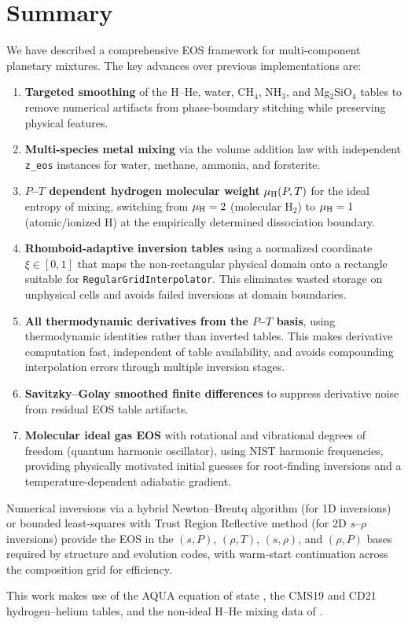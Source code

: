 \documentclass[twocolumn]{aastex701}
\begin{document}
\section{Summary}\label{sec:summary}

We have described a comprehensive EOS framework for multi-component planetary mixtures.
The key advances over previous implementations are:
\begin{enumerate}
    \item \textbf{Targeted smoothing} of the H--He, water, CH$_4$, NH$_3$, and Mg$_2$SiO$_4$ tables to remove numerical artifacts from phase-boundary stitching while preserving physical features.
    \item \textbf{Multi-species metal mixing} via the volume addition law with independent \texttt{z\_eos} instances for water, methane, ammonia, and forsterite.
    \item \textbf{$P$--$T$ dependent hydrogen molecular weight} $\mu_{\rm H}(P,T)$ for the ideal entropy of mixing, switching from $\mu_{\rm H} = 2$ (molecular H$_2$) to $\mu_{\rm H} = 1$ (atomic/ionized H) at the empirically determined dissociation boundary.
    \item \textbf{Rhomboid-adaptive inversion tables} using a normalized coordinate $\xi \in [0,1]$ that maps the non-rectangular physical domain onto a rectangle suitable for \texttt{RegularGridInterpolator}.  This eliminates wasted storage on unphysical cells and avoids failed inversions at domain boundaries.
    \item \textbf{All thermodynamic derivatives from the $P$--$T$ basis}, using thermodynamic identities rather than inverted tables.  This makes derivative computation fast, independent of table availability, and avoids compounding interpolation errors through multiple inversion stages.
    \item \textbf{Savitzky--Golay smoothed finite differences} to suppress derivative noise from residual EOS table artifacts.
    \item \textbf{Molecular ideal gas EOS} with rotational and vibrational degrees of freedom (quantum harmonic oscillator), using NIST harmonic frequencies, providing physically motivated initial guesses for root-finding inversions and a temperature-dependent adiabatic gradient.
\end{enumerate}
Numerical inversions via a hybrid Newton--Brentq algorithm (for 1D inversions) or bounded least-squares with Trust Region Reflective method (for 2D $s$--$\rho$ inversions) provide the EOS in the $(s,P)$, $(\rho,T)$, $(s,\rho)$, and $(\rho,P)$ bases required by structure and evolution codes, with warm-start continuation across the composition grid for efficiency.

\begin{acknowledgments}
This work makes use of the AQUA equation of state \citep{Haldemann2020}, the CMS19 \citep{Chabrier2019} and CD21 \citep{Chabrier2021} hydrogen--helium tables, and the non-ideal H--He mixing data of \citet{Howard2023a}.
\end{acknowledgments}



\end{document}
